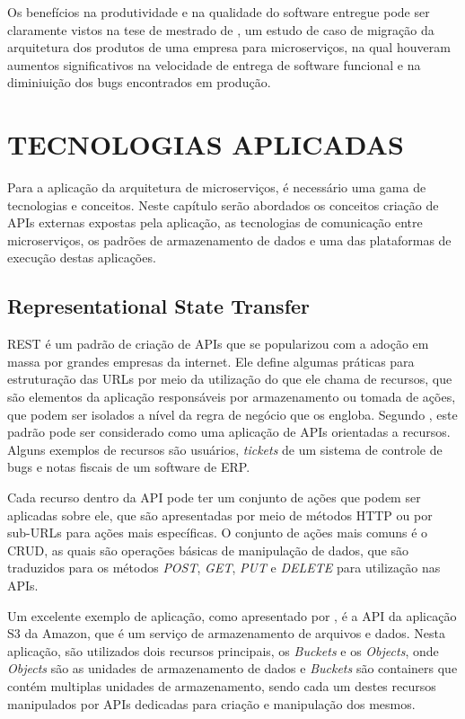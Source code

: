 Os benefícios na produtividade e na qualidade do software entregue pode
ser claramente vistos na tese de mestrado de , um estudo
de caso de migração da arquitetura dos produtos de uma empresa para
microserviços, na qual houveram aumentos significativos na velocidade de
entrega de software funcional e na diminiuição dos bugs encontrados em
produção.

\section{TECNOLOGIAS APLICADAS}

Para a aplicação da arquitetura de microserviços, é necessário uma gama de
tecnologias e conceitos. Neste capítulo serão abordados os conceitos criação
de APIs externas expostas pela aplicação, as tecnologias de comunicação entre
microserviços, os padrões de armazenamento de dados e uma das plataformas de
execução destas aplicações.

\subsection{Representational State Transfer}

\ac{REST} é um padrão de criação de \acp{API} que se popularizou com a
adoção em massa por grandes empresas da internet. Ele define algumas práticas
para estruturação das \acp{URL} por meio da utilização do que ele chama de
recursos, que são elementos da aplicação responsáveis por armazenamento ou
tomada de ações, que podem ser isolados a nível da regra de negócio que os
engloba. Segundo , este padrão pode ser considerado
como uma aplicação de \acp{API} orientadas a recursos. Alguns exemplos
de recursos são usuários, \emph{tickets} de um sistema de controle de bugs e
notas fiscais de um software de \ac{ERP}.

Cada recurso dentro da \ac{API} pode ter um conjunto de ações que podem ser
aplicadas sobre ele, que são apresentadas por meio de métodos \ac{HTTP} ou
por sub-\acp{URL} para ações mais específicas. O conjunto de ações mais
comuns é o \ac{CRUD}, as quais são operações básicas de manipulação de dados,
que são traduzidos para os métodos \emph{POST}, \emph{GET}, \emph{PUT} e
\emph{DELETE} para utilização nas \acp{API}.

Um excelente exemplo de aplicação, como apresentado por
, é a \ac{API} da aplicação S3 da Amazon, que é
um serviço de armazenamento de arquivos e dados. Nesta aplicação, são
utilizados dois recursos principais, os \emph{Buckets} e os \emph{Objects},
onde \emph{Objects} são as unidades de armazenamento de dados e \emph{Buckets}
são containers que contém multiplas unidades de armazenamento, sendo cada
um destes recursos manipulados por \acp{API} dedicadas para criação e
manipulação dos mesmos.

